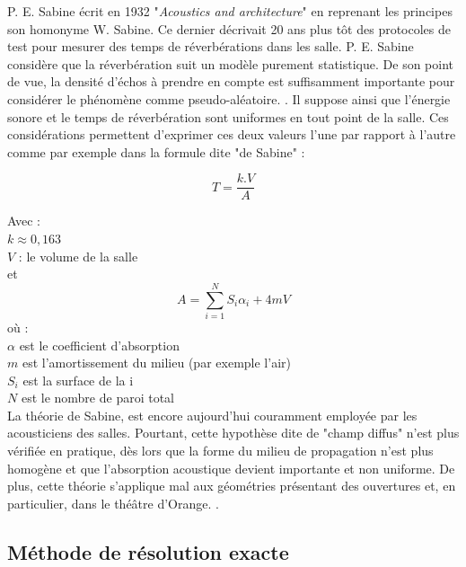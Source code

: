 P. E. Sabine écrit en 1932 "\textit{Acoustics and architecture}" en reprenant les principes son homonyme W. Sabine. Ce dernier décrivait 20 ans plus tôt des protocoles de test pour mesurer des
temps de réverbérations dans les salle. P. E. Sabine considère que la réverbération suit un modèle purement statistique. De son point de vue, la densité d'échos à prendre en compte est suffisamment importante pour considérer le phénomène comme pseudo-aléatoire. \cite[p. 19]{Kandelman}. Il suppose ainsi que l’énergie sonore et le temps de réverbération sont uniformes en tout point de la salle. Ces considérations permettent d'exprimer ces deux valeurs l'une par rapport à l'autre comme par exemple dans la formule dite "de Sabine" : 

\begin{equation}
   	T = \frac{k.V}{A}
\end{equation}

Avec : \\
$k \approx 0,163$ \\
$V$ : le volume de la salle\\
et
\begin{equation}
   	A = \sum_{i=1}^N S_{i}\alpha_{i} + 4mV
\end{equation}
où : \\
$\alpha$ est le coefficient d'absorption \\
$m$ est l'amortissement du milieu (par exemple l'air) \\
$S_{i}$ est la surface de la i \\
$N$ est le nombre de paroi total \\

La théorie de Sabine, est encore aujourd'hui couramment employée par les acousticiens des salles. Pourtant, cette hypothèse dite de "champ diffus" n’est plus vérifiée en pratique, dès lors que la forme du milieu de propagation n’est plus homogène et que l’absorption acoustique devient importante et non uniforme. De plus, cette théorie s’applique mal aux géométries présentant des ouvertures et, en particulier, dans le théâtre d'Orange. \cite[p. 60]{picaut}.

 
	\subsection{Méthode de résolution exacte}

